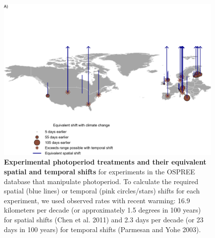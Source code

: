 \documentclass{article}
\begin{document}
\begin{figure}[p]
\centering
\includegraphics{..//..//analyses/photoperiod/figures/ospree_photopmap.pdf} 
\caption{\textbf{Experimental photoperiod treatments and their equivalent spatial and temporal shifts} for experiments in the OSPREE database that manipulate photoperiod. To calculate the required spatial (blue lines) or temporal (pink circles/stars) shifts for each experiment, we used observed rates with recent warming: 16.9 kilometers per decade (or approximately 1.5 degrees in 100 years) for spatial shifts (Chen et al. 2011) and 2.3 days per decade (or 23 days in 100 years) for temporal shifts (Parmesan and Yohe 2003).}
 \label{fig:photomap}
 \end{figure}


 
 
\end{document}
